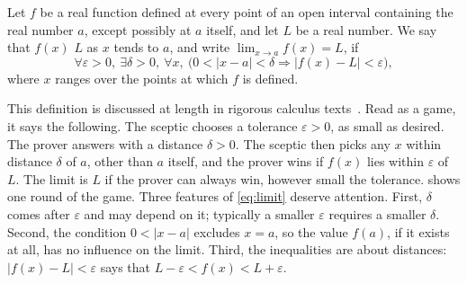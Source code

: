 \begin{definition}
\label{def:limit}
Let $f$ be a real function defined at every point of an open interval containing the real number $a$, except possibly at $a$ itself, and let $L$ be a real number. We say that $f(x)$  $L$ as $x$ tends to $a$, and write $\lim_{x\to a}f(x)=L$, if
\begin{equation}
\forall\varepsilon>0,\ \exists\delta>0,\ \forall x,\ \bigl(0<|x-a|<\delta\Rightarrow|f(x)-L|<\varepsilon\bigr),
\label{eq:limit}
\end{equation}
where $x$ ranges over the points at which $f$ is defined.
\end{definition}

This definition is discussed at length in rigorous calculus texts~\cite{spivak2008calculus}. Read as a game, it says the following. The sceptic chooses a tolerance $\varepsilon>0$, as small as desired. The prover answers with a distance $\delta>0$. The sceptic then picks any $x$ within distance $\delta$ of $a$, other than $a$ itself, and the prover wins if $f(x)$ lies within $\varepsilon$ of $L$. The limit is $L$ if the prover can always win, however small the tolerance.  shows one round of the game. Three features of \eqref{eq:limit} deserve attention. First, $\delta$ comes after $\varepsilon$ and may depend on it; typically a smaller $\varepsilon$ requires a smaller $\delta$. Second, the condition $0<|x-a|$ excludes $x=a$, so the value $f(a)$, if it exists at all, has no influence on the limit. Third, the inequalities are about distances: $|f(x)-L|<\varepsilon$ says that $L-\varepsilon<f(x)<L+\varepsilon$.

\begin{figure}
\end{figure}

